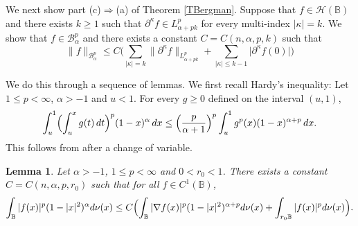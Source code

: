 \documentclass{amsart}
\newtheorem{lemma}[theorem]{Lemma}
\theoremstyle{definition}
\theoremstyle{remark}
\begin{document}
We next show part (c)$\Rightarrow$(a) of Theorem \ref{TBergman}.
Suppose that $f\in\mathcal H(\mathbb B)$ and there exists $k\ge 1$
such that $\partial^\kappa f\in L^p_{\alpha+pk}$ for every multi-index
$\vert\kappa\vert=k$.
We show that $f\in\mathcal B^p_\alpha$ and there exists a constant
$C=C(n,\alpha,p,k)$ such that
\begin{equation}\label{dimpa}
\|f\|_{\mathcal B^p_\alpha}
\le C\biggl(\sum_{\vert\kappa\vert=k} \|\partial^\kappa f\|_{L^p_{\alpha+pk}}
     +\sum_{\vert\kappa\vert\le k-1} \vert\partial^\kappa f(0)\vert\biggr)
\end{equation}

We do this through a sequence of lemmas.
We first recall Hardy's inequality:
Let $1\le p<\infty$, $\alpha>-1$ and $u<1$.
For every $g\ge 0$ defined on the interval $(u,1)$,
\begin{equation}\label{HardyI}
\int_u^1\Bigl(\int_u^x g(t)\,dt\Bigr)^p(1-x)^\alpha\,dx
\le \Bigl(\frac{p}{\alpha+1}\Bigr)^p\int_u^1 g^p(x)(1-x)^{\alpha+p}\,dx.
\end{equation}
This follows from \cite[Lemma 3.14(ii)]{SW} after a change of variable.

\begin{lemma}\label{LAHardy}
Let $\alpha>-1$, $1\le p<\infty$ and $0<r_0<1$.
There exists a constant $C=C(n,\alpha,p,r_0)$ such that for all $f\in C^1(\mathbb B)$,
\begin{equation*}
\int_{\mathbb B} \vert f(x)\vert^p(1-\vert x\vert^2)^\alpha d\nu(x)
\le C\Bigl(
\int_{\mathbb B} \vert \nabla f(x)\vert^p(1-\vert x\vert^2)^{\alpha+p} d\nu(x)
+\int_{r_0\mathbb B} \vert f(x)\vert^p d\nu(x)
\Bigr).
\end{equation*}
\end{lemma}
\end{document}
